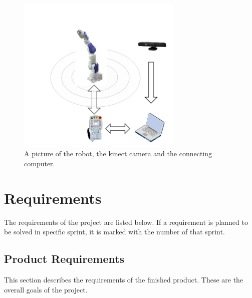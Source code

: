 \documentclass[10pt,a4paper]{article}
\begin{document}
\begin{figure}[H] 
  \centering
    \includegraphics[width = 0.7\textwidth]{robot.jpg}
    \caption{A picture of the robot, the kinect camera and the connecting computer.}
    \label{fig:safetyzone}
\end{figure}


\section{Requirements}
The requirements of the project are listed below. If a requirement is planned to be solved in specific sprint, it is marked with the number of that sprint. 
{\addtolength{\leftskip}{10mm}
\subsection{Product Requirements}
This section describes the requirements of the finished product. These are the overall goals of the project. \par}
\end{document}
